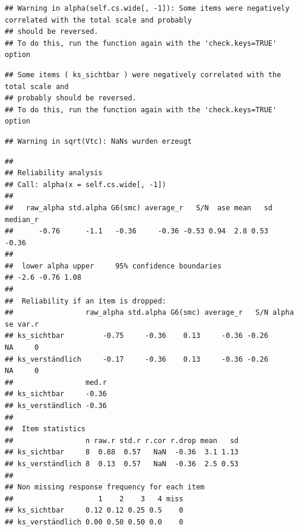 \documentclass[
  english,
  man,floatsintext]{apa6}
\begin{document}
\begin{verbatim}
## Warning in alpha(self.cs.wide[, -1]): Some items were negatively correlated with the total scale and probably 
## should be reversed.  
## To do this, run the function again with the 'check.keys=TRUE' option
\end{verbatim}

\begin{verbatim}
## Some items ( ks_sichtbar ) were negatively correlated with the total scale and 
## probably should be reversed.  
## To do this, run the function again with the 'check.keys=TRUE' option
\end{verbatim}

\begin{verbatim}
## Warning in sqrt(Vtc): NaNs wurden erzeugt
\end{verbatim}

\begin{verbatim}
## 
## Reliability analysis   
## Call: alpha(x = self.cs.wide[, -1])
## 
##   raw_alpha std.alpha G6(smc) average_r   S/N  ase mean   sd median_r
##      -0.76      -1.1   -0.36     -0.36 -0.53 0.94  2.8 0.53    -0.36
## 
##  lower alpha upper     95% confidence boundaries
## -2.6 -0.76 1.08 
## 
##  Reliability if an item is dropped:
##                 raw_alpha std.alpha G6(smc) average_r   S/N alpha se var.r
## ks_sichtbar         -0.75     -0.36    0.13     -0.36 -0.26       NA     0
## ks_verständlich     -0.17     -0.36    0.13     -0.36 -0.26       NA     0
##                 med.r
## ks_sichtbar     -0.36
## ks_verständlich -0.36
## 
##  Item statistics 
##                 n raw.r std.r r.cor r.drop mean   sd
## ks_sichtbar     8  0.88  0.57   NaN  -0.36  3.1 1.13
## ks_verständlich 8  0.13  0.57   NaN  -0.36  2.5 0.53
## 
## Non missing response frequency for each item
##                    1    2    3   4 miss
## ks_sichtbar     0.12 0.12 0.25 0.5    0
## ks_verständlich 0.00 0.50 0.50 0.0    0
\end{verbatim}
\end{document}
